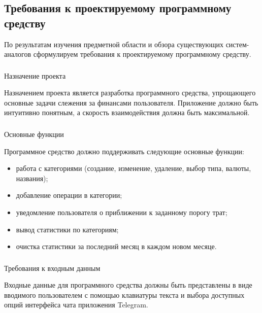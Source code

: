 \subsection{Требования к проектируемому программному средству}
\label{sec:analysis:specification}

По результатам изучения предметной области \cite{ddd_quickly} и обзора существующих систем-аналогов сформулируем требования к проектируемому программному средству.

\subsubsection{} Назначение проекта
\label{sec:analysis:specification:purpose}

Назначением проекта является разработка программного средства, упрощающего основные задачи слежения за финансами пользователя. Приложение должно быть интуитивно понятным, а скорость взаимодействия должна быть максимальной.

\subsubsection{} Основные функции
\label{sec:analysis:specification:functions}

Программное средство должно поддерживать следующие основные фун\-к\-ции:

\begin{itemize}
	\item работа с категориями (создание, изменение, удаление, выбор типа, валюты, названия);
	\item добавление операции в категории;
	\item уведомление пользователя о приближении к заданному порогу трат;
	\item вывод статистики по категориям;
	\item очистка статистики за последний месяц в каждом новом месяце.
\end{itemize}

\subsubsection{} Требования к входным данным
\label{sec:analysis:specification:inputs}

Входные данные для программного средства должны быть представлены в виде вводимого пользователем с помощью клавиатуры текста и выбора доступных опций интерфейса чата приложения Telegram.

